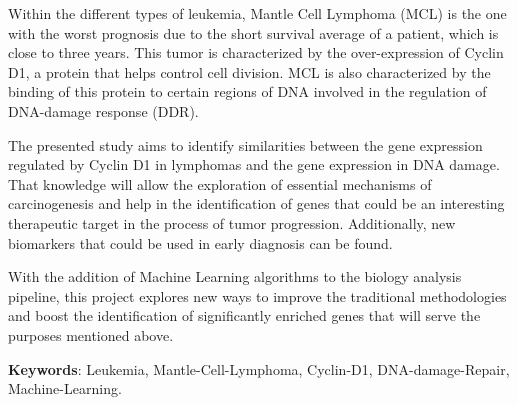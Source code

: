 Within the different types of leukemia, Mantle Cell Lymphoma (MCL) is the one with the worst prognosis due to the short survival average of a patient, which is close to three years.
This tumor is characterized by the over-expression of Cyclin D1, a protein that helps control cell division. MCL is also characterized by the binding of this protein to certain regions of DNA involved in the regulation of DNA-damage response (DDR).


The presented study aims to identify similarities between the gene expression regulated by Cyclin D1 in lymphomas and the gene expression in DNA damage.
That knowledge will allow the exploration of essential mechanisms of carcinogenesis and help in the identification of genes that could be an interesting therapeutic target in the process of tumor progression. Additionally, new biomarkers that could be used in early diagnosis can be found.

With the addition of Machine Learning algorithms to the biology analysis pipeline, this project explores new ways to improve the traditional methodologies and boost the identification of significantly enriched genes that will serve the purposes mentioned above.



\vspace{1.5cm}

\textbf{Keywords}: Leukemia, Mantle-Cell-Lymphoma, Cyclin-D1, DNA-damage-Repair, Machine-Learning.